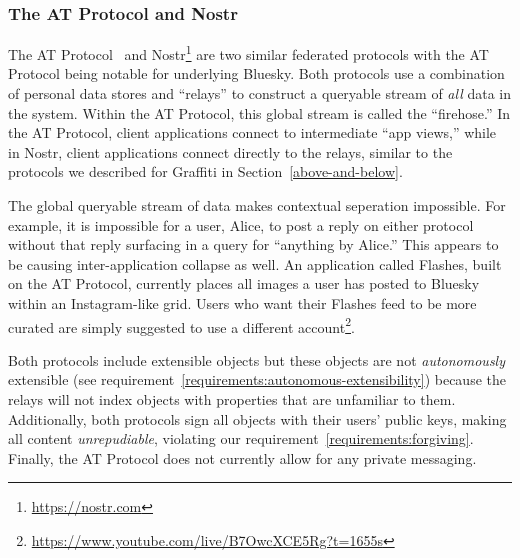 

\subsubsection{The AT Protocol and Nostr}

The AT Protocol~\cite{bluesky} and Nostr\footnote{
\url{https://nostr.com}
} are two similar federated protocols
with the AT Protocol being notable for underlying Bluesky.
Both protocols use a combination of personal data stores and ``relays''
to construct a queryable stream of \emph{all} data in the system.
Within the AT Protocol, this global stream is called the ``firehose.''
In the AT Protocol, client applications connect to intermediate ``app views,''
while in Nostr, client applications connect directly to the relays, similar
to the protocols we described for Graffiti in Section~\ref{above-and-below}.

The global queryable stream of data makes contextual seperation impossible.
For example, it is impossible for a user, Alice, to post a reply on either protocol
without that reply surfacing in a query for ``anything by Alice.''
This appears to be causing inter-application collapse as well.
An application called Flashes, built on the AT Protocol,
currently places all images a user has posted to Bluesky within
an Instagram-like grid. Users who want their Flashes feed to be
more curated are simply suggested to use a different account\footnote{
    \url{https://www.youtube.com/live/B7OwcXCE5Rg?t=1655s}
}.

Both protocols include extensible objects but these objects are not
\emph{autonomously} extensible (see requirement~\ref{requirements:autonomous-extensibility})
because the relays will not index objects with properties that are unfamiliar to them.
Additionally, both protocols sign all objects with their users' public keys, making
all content \emph{unrepudiable}, violating our requirement~\ref{requirements:forgiving}.
Finally, the AT Protocol does not currently allow for
any private messaging.



